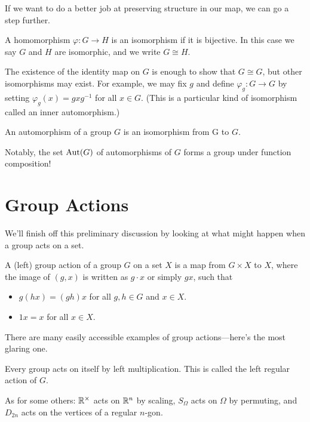 \documentclass[../m171main.tex]{subfiles}
\begin{document}
If we want to do a better job at preserving structure in our map, we can go a step further.

\begin{definition}[Isomorphism]
    A homomorphism $\varphi : G \to H$ is an isomorphism if it is bijective.
    In this case we say $G$ and $H$ are isomorphic, and we write $G \cong H$.
\end{definition}

The existence of the identity map on $G$ is enough to show that $G \cong G$, but other isomorphisms may exist.
For example, we may fix $g$ and define $\varphi_g : G \to G$ by setting $\varphi_g(x) = g x g^{-1}$ for all $x \in G$.
(This is a particular kind of isomorphism called an inner automorphism.)

\begin{definition}[Automorphism]
    An automorphism of a group $G$ is an isomorphism from G to $G$.
\end{definition}

Notably, the set $\operatorname{Aut}(G)$ of automorphisms of $G$ forms a group under function composition!

\section{Group Actions}
We'll finish off this preliminary discussion by looking at what might happen when a group acts on a set.

\begin{definition}
    A (left) group action of a group $G$ on a set $X$ is a map from $G \times X$ to $X$, where the image of $(g,x)$ is written as $g \cdot x$ or simply $gx$, such that
    \begin{itemize}
        \item $g(hx) = (gh)x$ for all $g,h \in G$ and $x \in X$.
        \item $1x = x$ for all $x \in X$.
    \end{itemize}
\end{definition}

There are many easily accessible examples of group actions---here's the most glaring one.

\begin{definition}
    Every group acts on itself by left multiplication.
    This is called the left regular action of $G$.
\end{definition}

As for some others: $\mathbb{R}^\times$ acts on $\mathbb{R}^n$ by scaling, $S_\Omega$ acts on $\Omega$ by permuting, and $D_{2n}$ acts on the vertices of a regular $n$-gon.
\end{document}

